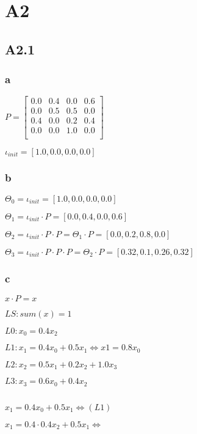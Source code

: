 
\section{A2}

\subsection{A2.1}

\subsubsection{a}

$
P = \begin{bmatrix}
0.0 & 0.4 & 0.0 & 0.6 \\
0.0 & 0.5 & 0.5 & 0.0 \\
0.4 & 0.0 & 0.2 & 0.4 \\
0.0 & 0.0 & 1.0 & 0.0 \\
\end{bmatrix}
$

$\iota_{init} = [1.0, 0.0, 0.0, 0.0]$

\subsubsection{b}

$\Theta_0 = \iota_{init} = [1.0, 0.0, 0.0, 0.0]$

$\Theta_1 = \iota_{init} \cdot P = [0.0, 0.4, 0.0, 0.6]$

$\Theta_2 = \iota_{init} \cdot P \cdot P = \Theta_1 \cdot P = [0.0, 0.2, 0.8, 0.0]$

$\Theta_3 = \iota_{init} \cdot P \cdot P \cdot P = \Theta_2 \cdot P = [0.32, 0.1, 0.26, 0.32]$

\subsubsection{c}

$x \cdot P = x$

$LS: sum(x) = 1$

$L0: x_0 = 0.4x_2$

$L1: x_1 = 0.4x_0 + 0.5x_1 \Leftrightarrow x1 = 0.8x_0$

$L2: x_2 = 0.5x_1 + 0.2x_2 + 1.0x_3$

$L3: x_3 = 0.6x_0 + 0.4x_2$

$ $

$x_1 = 0.4x_0 + 0.5x_1 \Leftrightarrow    (L1)$

$x_1 = 0.4\cdot0.4x_2 + 0.5x_1 \Leftrightarrow$

